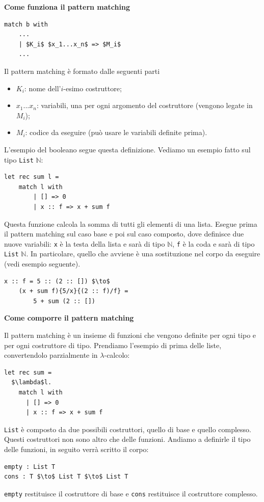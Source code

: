 \documentclass{article}
\begin{document}
\bigskip
\bigskip

\noindent \textbf{Come funziona il pattern matching}
\begin{lstlisting}[mathescape=true]
match b with
    ...
    | $K_i$ $x_1...x_n$ => $M_i$
    ...
\end{lstlisting}
Il pattern matching è formato dalle seguenti parti
\begin{itemize}
    \item $K_i$: nome dell'$i$-esimo costruttore;
    \item $x_1...x_n$: variabili, una per ogni argomento del costruttore (vengono legate in $M_i$);
    \item $M_i$: codice da eseguire (può usare le variabili definite prima).
\end{itemize}
L'esempio del booleano segue questa definizione. Vediamo un esempio fatto sul tipo \verb|List| $\mathbb{N}$:
\begin{lstlisting}[mathescape=true]
let rec sum l =
    match l with
        | [] => 0
        | x :: f => x + sum f
\end{lstlisting}
Questa funzione calcola la somma di tutti gli elementi di una lista. Esegue prima il pattern matching sul caso base e poi sul caso composto, dove definisce due nuove variabili: \verb|x| è la testa della lista e sarà di tipo $\mathbb{N}$, \verb|f| è la coda e sarà di tipo \verb|List| $\mathbb{N}$. In particolare, quello che avviene è una sostituzione nel corpo da eseguire (vedi esempio seguente).
\begin{lstlisting}[mathescape=true]
x :: f = 5 :: (2 :: []) $\to$
    (x + sum f){5/x}{(2 :: f)/f} =
        5 + sum (2 :: [])
\end{lstlisting}

\bigskip
\bigskip

\noindent \textbf{Come comporre il pattern matching}

\bigskip

Il pattern matching è un insieme di funzioni che vengono definite per ogni tipo e per ogni costruttore di tipo. Prendiamo l'esempio di prima delle liste, convertendolo parzialmente in $\lambda$-calcolo:
\begin{lstlisting}[mathescape=true, caption={Funzione convertita in $\lambda$-calcolo},captionpos=b,label=fun]
let rec sum =
  $\lambda$l.
    match l with
      | [] => 0
      | x :: f => x + sum f
\end{lstlisting}

\bigskip

\verb|List| è composto da due possibili costruttori, quello di base e quello complesso. Questi costruttori non sono altro che delle funzioni. Andiamo a definirle il tipo delle funzioni, in seguito verrà scritto il corpo:
\begin{lstlisting}[mathescape=true]
empty : List T
cons : T $\to$ List T $\to$ List T
\end{lstlisting}
\verb|empty| restituisce il costruttore di base e \verb|cons| restituisce il costruttore complesso.
\end{document}
